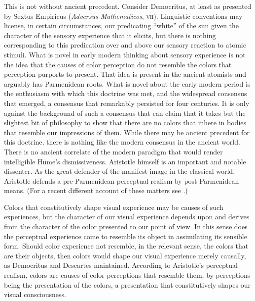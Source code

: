 This is not without ancient precedent. Consider Democritus, at least as presented by Sextus Empiricus (\emph{Adversus Mathematicos}, \textsc{vii}). Linguistic conventions may license, in certain circumstances, our predicating ``white'' of the sun given the character of the sensory experience that it elicits, but there is nothing corresponding to this predication over and above our sensory reaction to atomic stimuli. What is novel in early modern thinking about sensory experience is not the idea that the causes of color perception do not resemble the colors that perception purports to present. That idea is present in the ancient atomists and arguably has Parmenidean roots. What is novel about the early modern period is the enthusiasm with which this doctrine was met, and the widespread consensus that emerged, a consensus that remarkably persisted for four centuries. It is only against the background of such a consensus that \citet[]{Hume:1748zr} can claim that it takes but the slightest bit of philosophy to show that there are no colors that inhere in bodies that resemble our impressions of them. While there may be ancient precedent for this doctrine, there is nothing like the modern consensus in the ancient world. There is no ancient correlate of the modern paradigm that would render intelligible Hume's dismissiveness. Aristotle himself is an important and notable dissenter. As the great defender of the manifest image in the classical world, Aristotle defends a pre-Parmenidean perceptual realism by post-Parmenidean means. (For a recent different account of these matters see \citealt{Lee:2011ys}.)

Colors that constitutively shape visual experience may be causes of such experiences, but the character of our visual experience depends upon and derives from the character of the color presented to our point of view. In this sense does the perceptual experience come to resemble its object in assimilating its sensible form. Should color experience not resemble, in the relevant sense, the colors that are their objects, then colors would shape our visual experience merely causally, as Democritus and Descartes maintained. According to Aristotle's perceptual realism, colors are causes of color perceptions that resemble them, by perceptions being the presentation of the colors, a presentation that constitutively shapes our visual consciousness.

